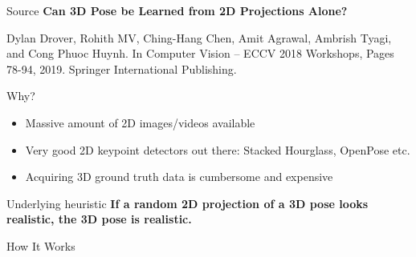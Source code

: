 \documentclass[8pt]{beamer}
\begin{document}
	\begin{frame}{Source}
		\textbf{Can 3D Pose be Learned from 2D Projections Alone?}\linebreak
		\begin{footnotesize}
			Dylan Drover, Rohith MV, Ching-Hang Chen, Amit Agrawal, Ambrish Tyagi, and Cong Phuoc Huynh.\linebreak
			In Computer Vision -- ECCV 2018 Workshops, Pages 78-94, 2019. Springer International Publishing.
		\end{footnotesize}
	\end{frame}

	\begin{frame}{Why?}
		\begin{itemize}
			\item Massive amount of 2D images/videos available
			\item Very good 2D keypoint detectors out there: Stacked Hourglass, OpenPose etc.
			\item Acquiring 3D ground truth data is cumbersome and expensive
		\end{itemize}
	\end{frame}

	\begin{frame}{Underlying heuristic}
		\textbf{If a random 2D projection of a 3D pose looks realistic, the 3D pose is realistic.}
	\end{frame}

	\begin{frame}{How It Works}
		\begin{figure}
			\centering
		\end{figure}
	\end{frame}
\end{document}
